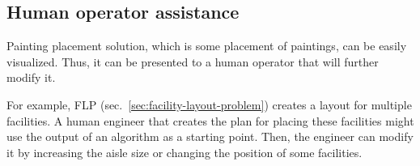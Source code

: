\subsection{Human operator assistance}\label{subsec:human-operator-assistance}
Painting placement solution, which is some placement of paintings, can be easily visualized.
Thus, it can be presented to a human operator that will further modify it.

For example, FLP (sec.~\ref{sec:facility-layout-problem}) creates a layout for multiple facilities.
A human engineer that creates the plan for placing these facilities might use the output of an algorithm as a starting point.
Then, the engineer can modify it by increasing the aisle size or changing the position of some facilities.
